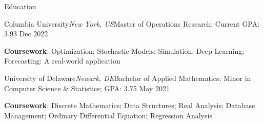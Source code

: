 \documentclass{resume} %
\begin{document}
\begin{rSection}{Education}
	\begin{rSubsection}{Columbia University}{\em New York, US}{Master of Operations Research; {Current GPA: 3.93}}
		{Dec 2022}
		\item {\bf Coursework}: Optimization; Stochastic Models; Simulation; Deep Learning; Forecasting: A real-world application
	\end{rSubsection}
	\vspace{-0.1em}
	\begin{rSubsection}{University of Delaware}{\em Newark, DE}{Bachelor of Applied Mathematics; Minor in Computer Science \& Statistics; {GPA: 3.75}} 
		{May 2021} 
		\item {\bf Coursework}: Discrete Mathematics; Data Structures; Real Analysis; Database Management; Ordinary Differential Equation; Regression Analysis

	\end{rSubsection}
\end{rSection}
	
\end{document}
